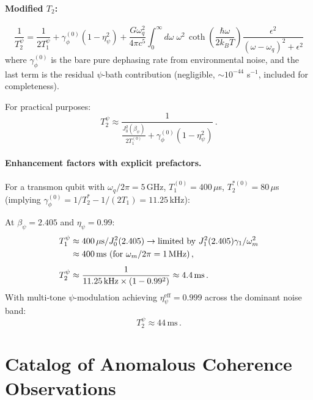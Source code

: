 \documentclass[aps,prl,twocolumn,superscriptaddress,nofootinbib,longbibliography]{revtex4-2}
\begin{document}
\paragraph{Modified $T_2$:}
\begin{equation}\label{eq:T2-psi}
\boxed{
\frac{1}{T_2^\psi} = \frac{1}{2T_1^\psi}
+ \gamma_\phi^{(0)}(1 - \eta_\psi^2)
+ \frac{G\omega_q^2}{4\pi c^5}\int_0^\infty d\omega\;
\omega^2\,\coth\!\left(\frac{\hbar\omega}{2k_BT}\right)
\frac{\epsilon^2}{(\omega-\omega_q)^2 + \epsilon^2}
}
\end{equation}
where $\gamma_\phi^{(0)}$ is the bare pure dephasing rate from
environmental noise, and the last term is the residual $\psi$-bath
contribution (negligible, $\sim 10^{-44}$ s$^{-1}$, included for
completeness).

For practical purposes:
\begin{equation}\label{eq:T2-practical}
T_2^\psi \approx \frac{1}{\frac{J_0^2(\beta_\psi)}{2T_1^{(0)}}
+ \gamma_\phi^{(0)}(1 - \eta_\psi^2)}\,.
\end{equation}

\paragraph{Enhancement factors with explicit prefactors.}
For a transmon qubit with $\omega_q/2\pi = 5$\,GHz, $T_1^{(0)} = 400\,\mu$s,
$T_2^{*(0)} = 80\,\mu$s (implying $\gamma_\phi^{(0)} = 1/T_2^* - 1/(2T_1)
= 11.25$\,kHz):

At $\beta_\psi = 2.405$ and $\eta_\psi = 0.99$:
\begin{align}
T_1^\psi &\approx 400\,\mu\text{s}/J_0^2(2.405) \to
\text{limited by } J_1^2(2.405)\gamma_1/\omega_m^2 \notag\\
&\approx 400\,\text{ms (for $\omega_m/2\pi = 1$\,MHz)}\,,
\label{eq:T1-numbers}\\[4pt]
T_2^\psi &\approx \frac{1}{11.25\,\text{kHz}\times(1 - 0.99^2)}
\approx 4.4\,\text{ms}\,.
\label{eq:T2-numbers}
\end{align}
With multi-tone $\psi$-modulation achieving $\eta_\psi^{\text{eff}}
= 0.999$ across the dominant noise band:
\begin{equation}
T_2^\psi \approx 44\,\text{ms}\,.
\end{equation}

\section{Catalog of Anomalous Coherence Observations}
\label{sec:anomalous}
\end{document}
